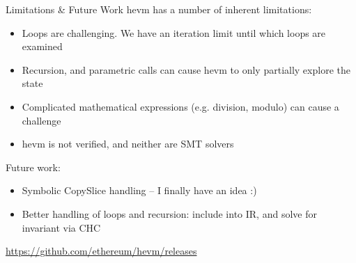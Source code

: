 \documentclass[aspectratio=169]{beamer}
\begin{document}
\begin{frame}[fragile=singleslide]{Limitations \& Future Work}
hevm has a number of inherent limitations:

\begin{itemize}
\item Loops are challenging. We have an iteration limit until which loops are examined
\item Recursion, and parametric calls can cause hevm to only partially explore the state
\item Complicated mathematical expressions (e.g. division, modulo) can cause a challenge
\item hevm is not verified, and neither are SMT solvers
\end{itemize}
\vspace{2ex}

Future work:
\begin{itemize}
\item Symbolic CopySlice handling -- I finally have an idea :)
\item Better handling of loops and recursion: include into IR, and solve for invariant via CHC
\end{itemize}

\bigskip

\quad  {}
\qquad \url{https://github.com/ethereum/hevm/releases}

\end{frame}

%
%
%
%
\end{document}
